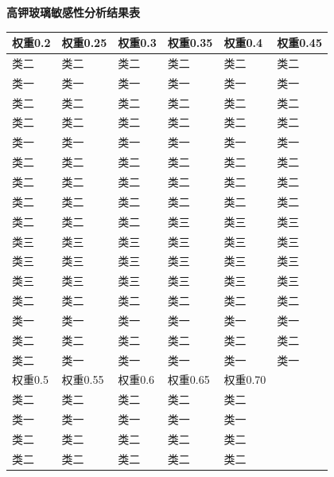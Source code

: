 \documentclass[withoutpreface,bwprint]{cumcmthesis} %
\begin{document}
\begin{appendices}
\newpage
\textbf{高钾玻璃敏感性分析结果表}

\begin{table}[H]
  \begin{tabular}{llllll}
    \toprule[1.5pt]
    权重0.2 & 权重0.25 & 权重0.3 & 权重0.35 & 权重0.4  & 权重0.45 \\ \hline
    类二    & 类二     & 类二    & 类二     & 类二     & 类二     \\
    类一    & 类一     & 类一    & 类一     & 类一     & 类一     \\
    类二    & 类二     & 类二    & 类二     & 类二     & 类二     \\
    类二    & 类二     & 类二    & 类二     & 类二     & 类二     \\
    类一    & 类一     & 类一    & 类一     & 类一     & 类一     \\
    类二    & 类二     & 类二    & 类二     & 类二     & 类二     \\
    类二    & 类二     & 类二    & 类二     & 类二     & 类二     \\
    类二    & 类二     & 类二    & 类二     & 类二     & 类二     \\
    类二    & 类二     & 类二    & 类三     & 类三     & 类三     \\
    类三    & 类三     & 类三    & 类三     & 类三     & 类三     \\
    类三    & 类三     & 类三    & 类三     & 类三     & 类三     \\
    类三    & 类三     & 类三    & 类三     & 类三     & 类三     \\
    类二    & 类二     & 类二    & 类二     & 类二     & 类二     \\
    类一    & 类一     & 类一    & 类一     & 类一     & 类一     \\
    类二    & 类二     & 类二    & 类二     & 类二     & 类二     \\
    类二    & 类一     & 类一    & 类一     & 类一     & 类一      \\
    权重0.5 & 权重0.55 & 权重0.6 & 权重0.65 & 权重0.70 &        \\
    类二    & 类二     & 类二    & 类二     & 类二     &        \\
    类一    & 类一     & 类一    & 类一     & 类一     &        \\
    类二    & 类二     & 类二    & 类二     & 类二     &        \\
    类二    & 类二     & 类二    & 类二     & 类二     &        \\

\end{tabular}
\end{table}
\end{appendices}
\end{document}
